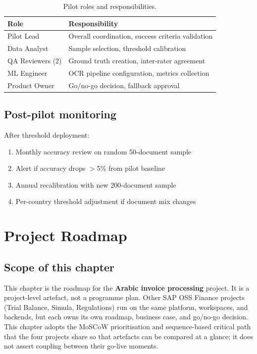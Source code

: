 \documentclass[11pt,a4paper,twoside]{report}
\begin{document}
\begin{table}[htbp]
\centering
\caption{Pilot roles and responsibilities.}
\label{tab:pilot-roles}
\footnotesize
\begin{tabularx}{\linewidth}{@{}l X@{}}
\toprule
\textbf{Role} & \textbf{Responsibility} \\ \midrule
Pilot Lead & Overall coordination, success criteria validation \\
Data Analyst & Sample selection, threshold calibration \\
QA Reviewers (2) & Ground truth creation, inter-rater agreement \\
ML Engineer & OCR pipeline configuration, metrics collection \\
Product Owner & Go/no-go decision, fallback approval \\
\bottomrule
\end{tabularx}
\end{table}

\section{Post-pilot monitoring}

After threshold deployment:
\begin{enumerate}
  \item Monthly accuracy review on random 50-document sample
  \item Alert if accuracy drops $>$5\% from pilot baseline
  \item Annual recalibration with new 200-document sample
  \item Per-country threshold adjustment if document mix changes
\end{enumerate}\chapter{Project Roadmap}\label{ch:ap-roadmap}

\section*{Scope of this chapter}

This chapter is the roadmap for the \textbf{Arabic invoice processing}
project. It is a project-level artefact, not a programme plan. Other
SAP OSS Finance projects (Trial Balance, Simula, Regulations) run on
the same platform, workspaces, and backends, but each owns its own
roadmap, business case, and go/no-go decision. This chapter adopts the
MoSCoW prioritisation and sequence-based critical path that the four
projects share so that artefacts can be compared at a glance; it does
not assert coupling between their go-live moments.
\end{document}

